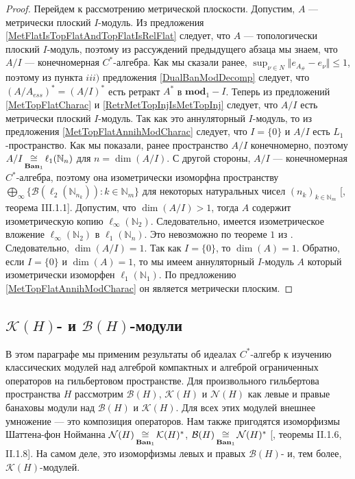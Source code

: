 \begin{proof}
Перейдем к рассмотрению метрической плоскости. Допустим, $A$ --- метрически плоский $I$-модуль. Из предложения \ref{MetFlatIsTopFlatAndTopFlatIsRelFlat} следует, что $A$ --- топологически плоский $I$-модуль, поэтому из рассуждений предыдущего абзаца мы знаем, что $A/I$ --- конечномерная $C^*$-алгебра. Как мы сказали ранее, $\sup_{\nu\in N}\Vert e_{A_\#}-e_\nu\Vert\leq 1$, поэтому из пункта $iii)$ предложения \ref{DualBanModDecomp} следует, что $(A/A_{ess})^*=(A/I)^*$ есть ретракт $A^*$ в $\mathbf{mod}_1-I$. Теперь из предложений \ref{MetTopFlatCharac} и \ref{RetrMetTopInjIsMetTopInj} следует, что $A/I$ есть метрически плоский $I$-модуль. Так как это аннуляторный $I$-модуль, то из предложения \ref{MetTopFlatAnnihModCharac} следует, что $I=\{0\}$ и $A/I$ есть $L_1$-пространство. Как мы показали, ранее пространство $A/I$ конечномерно, поэтому $A/I\mathop{\mathbin{\cong}}\limits_{\mathbf{Ban}_1}\ell_1(\mathbb{N}_n)$ для  $n=\operatorname{dim}(A/I)$. С другой стороны, $A/I$ --- конечномерная $C^*$-алгебра, поэтому она изометрически изоморфна пространству $\bigoplus_\infty\{ \mathcal{B}(\ell_2(\mathbb{N}_{n_k})):k\in\mathbb{N}_m\}$ для некоторых натуральных чисел $(n_k)_{k\in\mathbb{N}_m}$ [\cite{DavCSatrAlgByExmpl}, теорема III.1.1]. Допустим, что $\operatorname{dim}(A/I)>1$, тогда $A$ содержит изометрическую копию $\ell_\infty(\mathbb{N}_2)$. Следовательно, имеется изометрическое вложение $\ell_\infty(\mathbb{N}_2)$ в $\ell_1(\mathbb{N}_n)$. Это невозможно по теореме $1$ из \cite{LyubIsomEmdbFinDimLp}. Следовательно, $\operatorname{dim}(A/I)=1$. Так как $I=\{0\}$, то $\operatorname{dim}(A)=1$. Обратно, если $I=\{0\}$ и $\operatorname{dim}(A)=1$, то мы имеем аннуляторный $I$-модуль $A$ который изометрически изоморфен $\ell_1(\mathbb{N}_1)$. По предложению \ref{MetTopFlatAnnihModCharac} он является метрически плоским. 
\end{proof}


\subsection{\texorpdfstring{$\mathcal{K}(H)$}{K(H)}- и \texorpdfstring{$\mathcal{B}(H)$}{B(H)}-модули}
\label{SubSectionKHAndBHModules}

В этом параграфе мы применим результаты об идеалах $C^*$-алгебр к изучению классических модулей над алгеброй компактных и алгеброй ограниченных операторов на гильбертовом пространстве. Для произвольного гильбертова пространства $H$ рассмотрим $\mathcal{B}(H)$, $\mathcal{K}(H)$ и $\mathcal{N}(H)$ как левые и правые банаховы модули над $\mathcal{B}(H)$ и $\mathcal{K}(H)$. Для всех этих модулей внешнее умножение --- это композиция операторов. Нам также пригодятся изоморфизмы Шаттена-фон Нойманна $\mathcal{N}(H)\mathop{\mathbin{\cong}}\limits_{\mathbf{Ban}_1}\mathcal{K}(H)^*$, $\mathcal{B}(H)\mathop{\mathbin{\cong}}\limits_{\mathbf{Ban}_1}\mathcal{N}(H)^*$ [\cite{TakThOpAlgVol1}, теоремы II.1.6, II.1.8]. На самом деле, это изоморфизмы левых и правых $\mathcal{B}(H)$- и, тем более, $\mathcal{K}(H)$-модулей.


